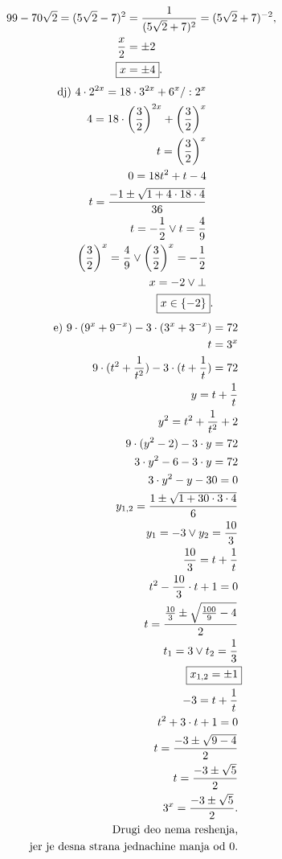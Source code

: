 \documentclass[11pt]{article}
\begin{document}
\begin{zad}
\begin{multicols}{2}
\begin{align*}
99-70\sqrt{2}=(5\sqrt{2}-7)^2&=\frac{1}{(5\sqrt{2}+7)^2}=(5\sqrt{2}+7)^{-2},\\
\frac{x}{2}&=\pm2\\
\Aboxed{x&=\pm4}.
\end{align*}
\begin{align*}
\text{dj) } 4\cdot 2^{2x}=18\cdot 3^{2x}+6^x/:2^x\\
4=18\cdot \left(\frac{3}{2}\right)^{2x}+\left(\frac{3}{2}\right)^x\\
t=\left(\frac{3}{2}\right)^x\\
0=18t^2+t-4\\
t=\frac{-1\pm \sqrt{1+4\cdot 18\cdot 4}}{36}\\
t=-\frac{1}{2} \lor t=\frac{4}{9}\\
\left(\frac{3}{2}\right)^x=\frac{4}{9} \lor \left(\frac{3}{2}\right)^x=-\frac{1}{2}\\
x=-2 \lor \bot \\
\Aboxed{x\in\{-2\}}.
\end{align*}
\begin{align*}
\text{e) } 9\cdot (9^x+9^{-x})-3\cdot (3^x+3^{-x})=72\\
t=3^x\\
9\cdot (t^2+\frac{1}{t^2})-3\cdot (t+\frac{1}{t})=72\\
y=t+\frac{1}{t}\\
y^2=t^2+\frac{1}{t^2}+2\\
9\cdot(y^2-2)-3\cdot y=72\\
3\cdot y^2-6-3\cdot y=72\\
3\cdot y^2-y-30=0\\
y_{1,2}=\frac{1\pm\sqrt{1+30\cdot3\cdot4}}{6}\\
y_1=-3 \lor y_2=\frac{10}{3}\\
\frac{10}{3}=t+\frac{1}{t}\\
t^2-\frac{10}{3}\cdot t +1=0\\
t=\frac{\frac{10}{3}\pm\sqrt{\frac{100}{9}-4}}{2}\\
t_1=3 \lor t_2=\frac{1}{3}\\
\Aboxed{x_{1,2}=\pm1}\\
-3=t+\frac{1}{t}\\
t^2+3\cdot t+1=0\\
t=\frac{-3\pm\sqrt{9-4}}{2}\\
t=\frac{-3\pm\sqrt{5}}{2}\\
3^x=\frac{-3\pm\sqrt{5}}{2}.\\
\text{Drugi deo nema reshenja,}\\
\text{jer je desna strana jednachine manja od 0}.\\

\end{align*}
\end{multicols}
\end{zad}
\end{document}
